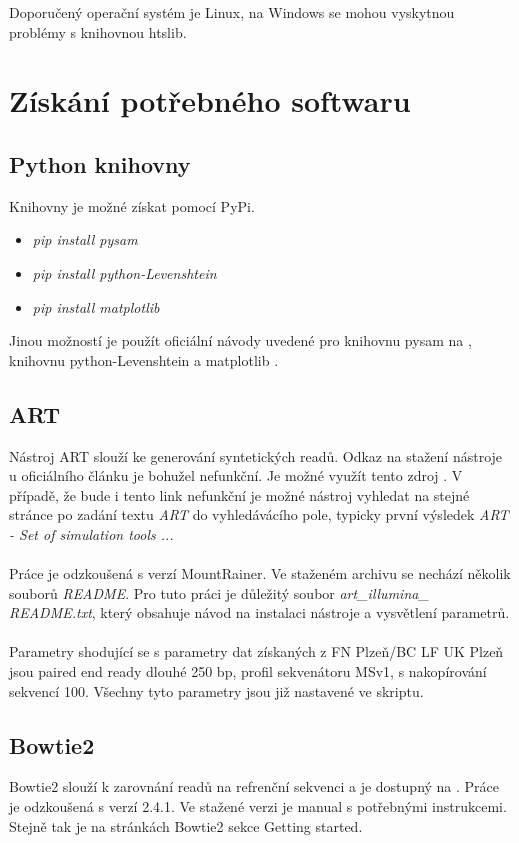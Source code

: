 \documentclass[czech,DP]{thesiskiv}
\numberwithin{equation}{section}
\begin{document}
\noindent
Doporučený operační systém je Linux, na Windows se mohou vyskytnou problémy s knihovnou htslib. 

\section{Získání potřebného softwaru}
\subsection{Python knihovny} 
Knihovny je možné získat pomocí PyPi.
\begin{itemize}
	\item \colorbox{gray!15}{\textit{pip install pysam}}
	\item \colorbox{gray!15}{\textit{pip install python-Levenshtein}}
	\item \colorbox{gray!15}{\textit{pip install matplotlib}}
\end{itemize}

\noindent
Jinou možností je použít oficiální návody uvedené pro knihovnu pysam na \cite{pysam}, knihovnu python-Levenshtein \cite{python_leve} a matplotlib \cite{matplotlib}.


\subsection{ART}
Nástroj ART slouží ke generování syntetických readů. Odkaz na stažení nástroje u oficiálního článku \cite{art} je bohužel nefunkční. Je možné využít tento zdroj \cite{art_download}. V případě, že bude i tento link nefunkční je možné nástroj vyhledat na stejné stránce po zadání textu \textit{ART} do vyhledávácího pole, typicky první výsledek \textit{ART - Set of simulation tools ... }
\\
\\
Práce je odzkoušená s verzí MountRainer. Ve staženém archivu se nechází několik souborů \textit{README}. Pro tuto práci je důležitý soubor \textit{art\_illumina\_\\README.txt}, který obsahuje návod na instalaci nástroje a vysvětlení parametrů.  
\\
\\
Parametry shodující se s parametry dat získaných z FN Plzeň/BC LF UK Plzeň jsou paired end ready dlouhé 250 bp, profil sekvenátoru MSv1, s nakopírování sekvencí 100. Všechny tyto parametry jsou již nastavené ve skriptu.


\subsection{Bowtie2}
Bowtie2 slouží k zarovnání readů na refrenční sekvenci a je dostupný na \cite{bowtie2_download}. Práce je odzkoušená s verzí 2.4.1. Ve stažené verzi je manual s potřebnými instrukcemi. Stejně tak je na stránkách Bowtie2 sekce Getting started. 
\end{document}
